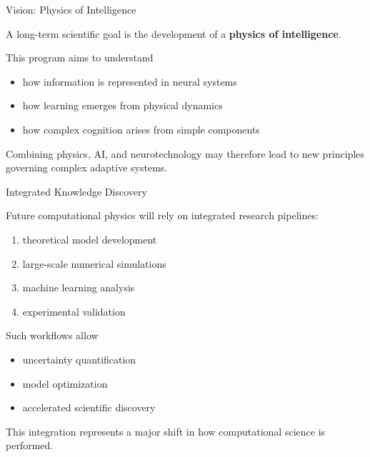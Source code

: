 \documentclass{beamer}
\begin{document}
\begin{frame}{Vision: Physics of Intelligence}

A long-term scientific goal is the development of a
\textbf{physics of intelligence}.

This program aims to understand

\begin{itemize}
\item how information is represented in neural systems
\item how learning emerges from physical dynamics
\item how complex cognition arises from simple components
\end{itemize}

Combining physics, AI, and neurotechnology may therefore
lead to new principles governing complex adaptive systems.

\end{frame}



\begin{frame}{Integrated Knowledge Discovery}

Future computational physics will rely on
integrated research pipelines:

\begin{enumerate}
\item theoretical model development
\item large-scale numerical simulations
\item machine learning analysis
\item experimental validation
\end{enumerate}

Such workflows allow

\begin{itemize}
\item uncertainty quantification
\item model optimization
\item accelerated scientific discovery
\end{itemize}

This integration represents a major shift in
how computational science is performed.

\end{frame}

\end{document}
